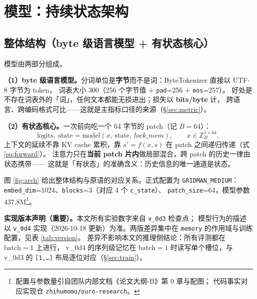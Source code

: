 \section{模型：持续状态架构}\label{sec:model}

\subsection{整体结构（byte 级语言模型 + 有状态核心）}\label{sec:model-overall}

模型由两部分组成。

\textbf{（1）byte 级语言模型。}分词单位是\textbf{字节}而不是词：ByteTokenizer 直接以 UTF-8 字节为 token，
词表大小 300（256 个字节值 $+$ \texttt{pad}=256 $+$ \texttt{eos}=257）。
好处是不存在词表外的「词」，任何文本都能无损进出；损失以 \textbf{bits/byte} 计，
跨语言、跨编码格式可比——这就是主指标口径的来源（\S\ref{sec:metric}）。

\textbf{（2）有状态核心。}一次前向吃一个 64 字节的 patch（记 $B=64$）：
\begin{equation}
\mathrm{logits},\; \mathrm{state} = \mathrm{model}(x,\ \mathrm{state},\ \mathit{lock\_mem}),
\qquad x \in \mathbb{Z}_B^{1\times 64},
\label{eq:model-call}
\end{equation}
上下文的延续不靠 KV cache 累积，靠 $s' = f(x,s)$ 在 patch 之间递归传递（式 \eqref{eq:forward}）。
注意力只在\textbf{当前 patch 片内}做局部混合，跨 patch 的历史一律由状态携带——
这就是「有状态」的准确含义：历史信息的唯一通道是状态。

图 \ref{fig:arch} 给出整体结构与原语的对应关系。正式配置为 \texttt{GRIDMAN\_MEDIUM}：
\texttt{embed\_dim}=1024、\texttt{blocks}=3（对应 4 个 \texttt{c\_state}）、
\texttt{patch\_size}=64，模型参数 437.8M\footnote{配置与参数量引自团队内部文档《论文大纲-B》第 0 章与配图；
代码事实对应实现仓 \texttt{zhihumomo/ouro-research}。}。

\textbf{实现版本声明（重要）。}本文所有实验数字来自 \texttt{v\_0d3} 检查点；
模型行为的描述以 \texttt{v\_0d4} 实现（2026-10-18 更新）为准。两版差异集中在
\texttt{memory} 的作用域与训练配置，见表 \ref{tab:version}。
差异不影响本文的推理侧结论：所有评测都在 $\mathrm{batch}=1$ 上进行，
v\_0d4 的序列级记忆在 $\mathrm{batch}=1$ 时读写单个槽位，与 v\_0d3 的
\texttt{[1,\ldots]} 布局逐位对应（\S\ref{sec:train}）。

